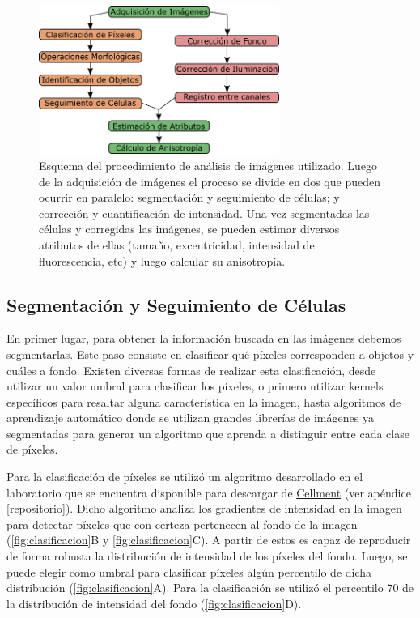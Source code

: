 \begin{figure}
    \centering
    \includegraphics[width=0.7\textwidth]{img/cap_2/analysis_pipeline.png}
    \caption{\footnotesize{Esquema del procedimiento de análisis de imágenes utilizado. Luego de la adquisición de imágenes el proceso se divide en dos que pueden ocurrir en paralelo: segmentación y seguimiento de células; y corrección y cuantificación de intensidad. Una vez segmentadas las células y corregidas las imágenes, se pueden estimar diversos atributos de ellas (tamaño, excentricidad, intensidad de fluorescencia, etc) y luego calcular su anisotropía.}}
    \label{fig:analisis_imagenes}
\end{figure}


\subsection{Segmentación y Seguimiento de Células}


En primer lugar, para obtener la información buscada en las imágenes debemos segmentarlas. Este paso consiste en clasificar qué píxeles corresponden a objetos y cuáles a fondo. Existen diversas formas de realizar esta clasificación, desde utilizar un valor umbral para clasificar los píxeles, o primero utilizar kernels específicos para resaltar alguna característica en la imagen, hasta algoritmos de aprendizaje automático donde se utilizan grandes librerías de imágenes ya segmentadas para generar un algoritmo que aprenda a distinguir entre cada clase de píxeles.

Para la clasificación de píxeles se utilizó un algoritmo desarrollado en el laboratorio que se encuentra disponible para descargar de \href{https://github.com/maurosilber/cellment/tree/master/cellment}{Cellment} (ver apéndice \ref{repositorio}). Dicho algoritmo analiza los gradientes de intensidad en la imagen para detectar píxeles que con certeza pertenecen al fondo de la imagen (\cref{fig:clasificacion}B y \ref{fig:clasificacion}C). A partir de estos es capaz de reproducir de forma robusta la distribución de intensidad de los píxeles del fondo. Luego, se puede elegir como umbral para clasificar píxeles algún percentilo de dicha distribución (\cref{fig:clasificacion}A). Para la clasificación se utilizó el percentilo 70 de la distribución de intensidad del fondo (\cref{fig:clasificacion}D).

